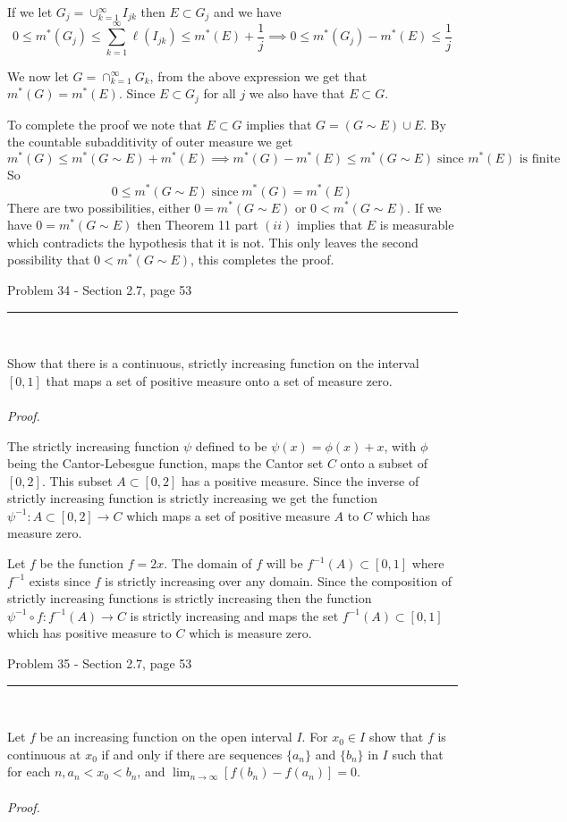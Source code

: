 \documentclass[11pt,reqno]{article}
\begin{document}
\noindent If we let $G_j = \cup_{k = 1}^\infty I_{jk}$ then $E \subset G_j$ and we have 
\[ 0 \le m^*(G_j) \le \sum_{k=1}^\infty \ell(I_{jk}) \le m^*(E) + \frac{1}{j} \implies 0 \le m^*(G_j) - m^*(E) \le \frac{1}{j} \]

\noindent We now let $G = \cap_{k = 1}^\infty G_k$, from the above expression we get that $m^*(G) = m^*(E)$. Since $E \subset G_j$ for all $j$ we also have that $E \subset G$.

To complete the proof we note that $E \subset G$ implies that $G = (G \sim E) \cup E$. By the countable subadditivity of outer measure we get 
\[ m^*(G) \le m^*(G \sim E) + m^*(E) \implies m^*(G) - m^*(E) \le m^*(G \sim E) \; \text{since $m^*(E)$ is finite} \]
\noindent So
\[ 0 \le m^*(G \sim E) \; \text{since} \; m^*(G) = m^*(E) \]
There are two possibilities, either $0 = m^*(G \sim E)$ or $0 < m^*(G \sim E)$. If we have $0 = m^*(G \sim E)$ then Theorem 11 part $(ii)$ implies that $E$ is measurable which contradicts the hypothesis that it is not. This only leaves the second possibility that $0 < m^*(G \sim E)$, this completes the proof.


\begin{flushleft} 
Problem 34 - Section 2.7, page 53\\
\rule{500pt}{1pt}\\
\end{flushleft} 

Show that there is a continuous, strictly increasing function on the interval $[0,1]$ that maps a set of positive measure onto a set of measure zero.
\\\\ \emph{Proof.}

The strictly increasing function $\psi$ defined to be $\psi(x) = \phi(x) + x$, with $\phi$ being the Cantor-Lebesgue function, maps the Cantor set $C$ onto a subset of $[0,2]$. This subset $A \subset [0,2]$ has a positive measure. Since the inverse of strictly increasing function is strictly increasing we get the function $\psi^{-1}: A \subset [0,2] \to C$ which maps a set of positive measure $A$ to $C$ which has measure zero.

Let $f$ be the function $f = 2 x$. The domain of $f$ will be $f^{-1}(A) \subset [0,1]$ where $f^{-1}$ exists since $f$ is strictly increasing over any domain. Since the composition of strictly increasing functions is strictly increasing then the function $\psi^{-1} \circ f : f^{-1}(A) \to C$ is strictly increasing and maps the set $f^{-1}(A) \subset [0,1]$ which has positive measure to $C$ which is measure zero.

\begin{flushleft} 
Problem 35 - Section 2.7, page 53\\
\rule{500pt}{1pt}\\
\end{flushleft} 

Let $f$ be an increasing function on the open interval $I$. For $x_0 \in I$ show that $f$ is continuous at $x_0$ if and only if there are sequences $\{ a_n \}$ and $\{ b_n \}$ in $I$ such that for each $n, a_n < x_0 < b_n$,  and $\lim_{n \to \infty} [f(b_n) - f(a_n)] = 0$.
\\\\ \emph{Proof.}
\end{document}
